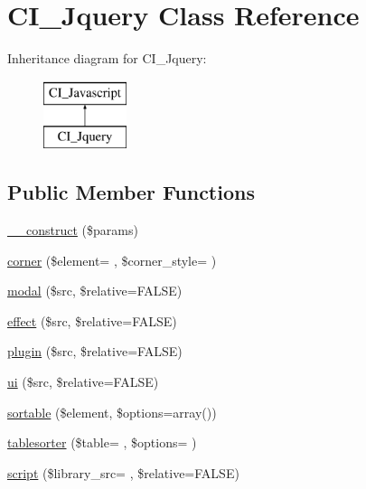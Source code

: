 \hypertarget{class_c_i___jquery}{}\section{C\+I\+\_\+\+Jquery Class Reference}
\label{class_c_i___jquery}
Inheritance diagram for C\+I\+\_\+\+Jquery\+:\begin{figure}[H]
\begin{center}
\leavevmode
\includegraphics[height=2.000000cm]{class_c_i___jquery}
\end{center}
\end{figure}
\subsection*{Public Member Functions}
\begin{DoxyCompactItemize}
\item 
\hyperlink{class_c_i___jquery_a9162320adff1a1a4afd7f2372f753a3e}{\+\_\+\+\_\+construct} (\$params)
\item 
\hyperlink{class_c_i___jquery_a0194acb433b4ce6b5b0d9d30cccceafb}{corner} (\$element= \textquotesingle{}\textquotesingle{}, \$corner\+\_\+style= \textquotesingle{}\textquotesingle{})
\item 
\hyperlink{class_c_i___jquery_a951696f5f5092fee0d2aba1f8602b419}{modal} (\$src, \$relative=F\+A\+L\+S\+E)
\item 
\hyperlink{class_c_i___jquery_a42898d255de9b25100e042825a1c4633}{effect} (\$src, \$relative=F\+A\+L\+S\+E)
\item 
\hyperlink{class_c_i___jquery_a25a0d7f0c18dac193aa2c67908c85c89}{plugin} (\$src, \$relative=F\+A\+L\+S\+E)
\item 
\hyperlink{class_c_i___jquery_ad2d6d964ed10597e0223f883c553cf0c}{ui} (\$src, \$relative=F\+A\+L\+S\+E)
\item 
\hyperlink{class_c_i___jquery_afb2aa7347e6ff89ab0177478a7f3869d}{sortable} (\$element, \$options=array())
\item 
\hyperlink{class_c_i___jquery_adb63aaf8e4cfc75853599e65ac3574a4}{tablesorter} (\$table= \textquotesingle{}\textquotesingle{}, \$options= \textquotesingle{}\textquotesingle{})
\item 
\hyperlink{class_c_i___jquery_a9ea7c49c96462a9ee8f8242c257937ac}{script} (\$library\+\_\+src= \textquotesingle{}\textquotesingle{}, \$relative=F\+A\+L\+S\+E)
\end{DoxyCompactItemize}
